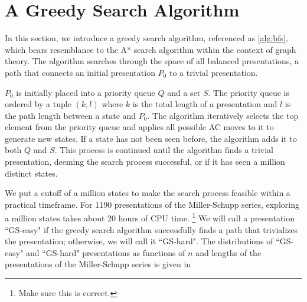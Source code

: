 
\section{A Greedy Search Algorithm}



In this section, we introduce a greedy search algorithm, referenced as \autoref{alg:bfs}, which bears resemblance to the A* search algorithm within the context of graph theory. The algorithm searches through the space of all balanced presentations, a path that connects an initial presentation $P_0$ to a trivial presentation. 
\newline 

$P_0$ is initially placed into a priority queue $Q$ and a set $S$. The priority queue is ordered by a tuple $(k, l)$ where $k$ is the total length of a presentation and $l$ is the path length between a state and $P_0$. The algorithm iteratively selects the top element from the priority queue and applies all possible AC moves to it to generate new states. If a state has not been seen before, the algorithm adds it to both $Q$ and $S$. This process is continued until the algorithm finds a trivial presentation, deeming the search process successful, or if it has seen a million distinct states. 
\newline

We put a cutoff of a million states to make the search process feasible within a practical timeframe. For 1190 presentations of the Miller-Schupp series, exploring a million states takes about 20 hours of CPU time. 
\footnote{Make sure this is correct.} We will call a presentation ``GS-easy" if the greedy search algorithm successfully finds a path that trivializes the presentation; otherwise, we will call it ``GS-hard". The distributions of ``GS-easy" and ``GS-hard" presentations as functions of $n$ and lengths of the presentations of the Miller-Schupp series is given in 

